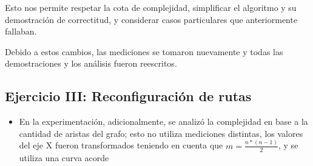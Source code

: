 		Esto nos permite respetar la cota de complejidad, simplificar el algoritmo y su demostración de correctitud, y considerar casos particulares que anteriormente fallaban.

		Debido a estos cambios, las mediciones se tomaron nuevamente y todas las demostraciones y los análisis fueron reescritos.

	\subsection*{Ejercicio III: Reconfiguración de rutas}

	\begin{itemize}

		\item En la experimentación, adicionalmente, se analizó la complejidad en base a la cantidad de aristas del grafo; esto no utiliza mediciones distintas, los valores del eje X fueron transformados teniendo en cuenta que $m = \frac{n * (n - 1)}{2}$, y se utiliza una curva acorde

	\end{itemize}
